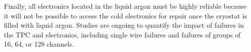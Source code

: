 Finally, all electronics located in the liquid argon must be highly reliable because it will not be possible to access the cold electronics for repair once the cryostat is filled with liquid argon.  Studies are ongoing to quantify the impact of failures in the TPC and electronics, including single wire failures and failures of groups of 16, 64, or 128 channels.

%
%
%
